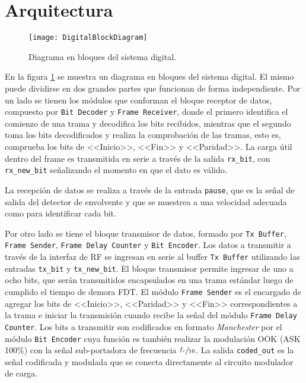 \section{Arquitectura}

\begin{figure}
	\centering
	\texttt{[image: DigitalBlockDiagram]}
	\caption{Diagrama en bloques del sistema digital.}
	\label{fig:DigitalBlockDiagram}
\end{figure}

En la figura \ref{fig:DigitalBlockDiagram} se muestra un diagrama en 
bloques del sistema digital. El mismo puede dividirse en dos grandes 
partes que funcionan de forma independiente. Por un lado se 
tienen los módulos que conforman el bloque receptor de datos, 
compuesto por \lstinline{Bit Decoder} y \lstinline{Frame Receiver}, 
donde el primero identifica el comienzo de una trama y decodifica 
los bits recibidos, mientras que el segundo toma los bits 
decodificados y realiza la comprobación de las tramas, esto es, 
comprueba los bits de <<Inicio>>, <<Fin>> y <<Paridad>>. La carga 
útil dentro del frame es transmitida en serie a través de la salida 
\lstinline{rx_bit}, con \lstinline{rx_new_bit} señalizando el 
momento en que el dato es válido.

La recepción de datos se realiza a través de la entrada 
\lstinline{pause}, que es la señal de salida del detector de envolvente
y que se muestrea a una velocidad adecuada como para identificar cada 
bit. 

Por otro lado se tiene el bloque transmisor de datos, formado por 
\lstinline{Tx Buffer}, \lstinline{Frame Sender},
\lstinline{Frame Delay Counter} y \lstinline{Bit Encoder}. Los datos a 
transmitir a través de la interfaz de RF se ingresan en serie al 
buffer \lstinline{Tx Buffer} utilizando las entradas \lstinline{tx_bit}
y \lstinline{tx_new_bit}. El bloque transmisor permite ingresar de uno a 
ocho bits, que serán transmitidos encapsulados en una trama estándar 
luego de cumplido el tiempo de demora FDT. El módulo 
\lstinline{Frame Sender} es el encargado de agregar los bits de 
<<Inicio>>, <<Paridad>> y <<Fin>> correspondientes a la trama e 
iniciar la transmisión cuando recibe la señal del módulo 
\lstinline{Frame Delay Counter}. Los bits a transmitir son codificados 
en formato \emph{Manchester} por el módulo \lstinline{Bit Encoder} 
cuya función es también realizar la modulación OOK (ASK 100\%) con la 
señal sub-portadora de frecuencia \(\sfrac{f_{c}}{16}\). La salida 
\lstinline{coded_out} es la señal codificada y modulada que se conecta 
directamente al circuito modulador de carga.


